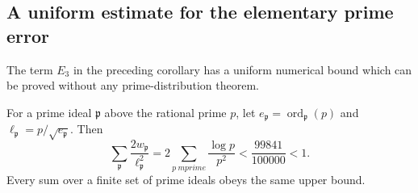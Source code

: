 \subsection{A uniform estimate for the elementary prime error}

The term $E_3$ in the preceding corollary has a uniform numerical bound
which can be proved without any prime-distribution theorem.

\begin{proposition}\label{div:prime-error}
For a prime ideal $\mathfrak p$ above the rational prime $p$, let
$e_{\mathfrak p}=\operatorname{ord}_{\mathfrak p}(p)$ and
$\ell_{\mathfrak p}=p/\sqrt{e_{\mathfrak p}}$. Then
\[
 \sum_{\mathfrak p}\frac{2w_{\mathfrak p}}{\ell_{\mathfrak p}^2}
 =2\sum_{p\ {
m prime}}\frac{\log p}{p^2}
 <\frac{99841}{100000}<1.
\]
Every sum over a finite set of prime ideals obeys the same upper bound.
\end{proposition}
